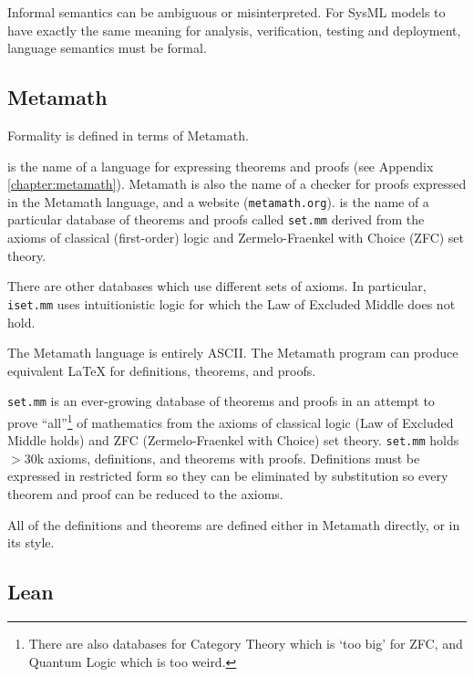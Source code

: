 
\pn Informal semantics can be ambiguous or misinterpreted.  For SysML models to have exactly the same meaning for analysis, verification, testing and deployment, language semantics must be formal.

\subsection{Metamath}\label{sec:metamath}

\pn Formality is defined in terms of Metamath.

\pn {} is the name of a language for expressing theorems and proofs (see Appendix \ref{chapter:metamath}).  
Metamath is also the name of a checker for proofs expressed in the Metamath language, and a website (\texttt{metamath.org}).  
 is the name of a particular database of theorems and proofs called \texttt{set.mm} derived from the axioms of classical (first-order) logic
and Zermelo-Fraenkel with Choice (ZFC) set theory.

\pn There are other databases which use different sets of axioms.  In particular, \texttt{iset.mm} uses intuitionistic logic for which the Law of Excluded Middle does not hold.

\pn The Metamath language is entirely ASCII.  The Metamath program can produce equivalent LaTeX for definitions, theorems, and proofs.

\pn \texttt{set.mm} is an ever-growing database of theorems and proofs in an attempt to prove ``all''\footnote{There are also databases for Category Theory which is `too big' for ZFC, and Quantum Logic which is too weird.} of mathematics from the axioms of classical logic (Law of Excluded Middle holds)
and ZFC (Zermelo-Fraenkel with Choice) set theory.
\texttt{set.mm} holds  $>$30k axioms, definitions, and theorems with proofs.  Definitions must be expressed in restricted form so they can be eliminated by substitution so every theorem and proof can be reduced to the axioms.

\pn All of the definitions and theorems are defined either in Metamath directly, or in its style.

\subsection{Lean}\label{sec:lean}

